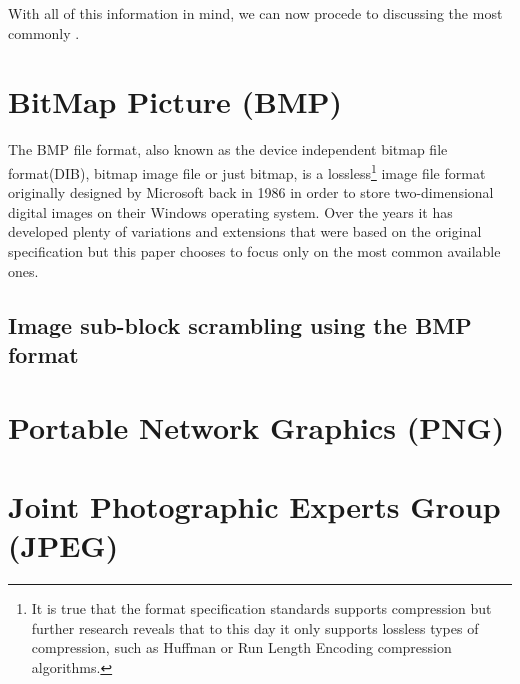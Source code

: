 \begin{multicols*}{2}
With all of this information in mind, we can now procede to discussing the most commonly .

\section{BitMap Picture (BMP)} \label{BMP_Explained_Chapter}

The BMP file format, also known as the device independent bitmap file format(DIB), bitmap image file or just bitmap, is a lossless\footnote{It is true that the format specification standards supports compression but further research reveals that to this day it only supports lossless types of compression, such as Huffman or Run Length Encoding compression algorithms.} image file format originally designed by Microsoft back in 1986 in order to store two-dimensional digital images on their Windows operating system. Over the years it has developed plenty of variations and extensions that were based on the original specification but this paper chooses to focus only on the most common available ones.





\subsection{Image sub-block scrambling using the BMP format}

\section{Portable Network Graphics (PNG)} \label{PNG_Explained_Chapter}

\section{Joint Photographic Experts Group (JPEG)} \label{JPEG_Explained_Chapter}

\end{multicols*}